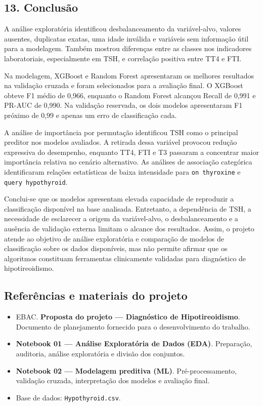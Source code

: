 \documentclass[
]{article}
\providecommand{\tightlist}{%
  \setlength{\itemsep}{0pt}\setlength{\parskip}{0pt}}
\begin{document}
\hypertarget{conclusuxe3o}{%
\subsection{13. Conclusão}\label{conclusuxe3o}}

A análise exploratória identificou desbalanceamento da variável-alvo,
valores ausentes, duplicatas exatas, uma idade inválida e variáveis sem
informação útil para a modelagem. Também mostrou diferenças entre as
classes nos indicadores laboratoriais, especialmente em TSH, e
correlação positiva entre TT4 e FTI.

Na modelagem, XGBoost e Random Forest apresentaram os melhores
resultados na validação cruzada e foram selecionados para a avaliação
final. O XGBoost obteve F1 médio de 0,966, enquanto o Random Forest
alcançou Recall de 0,991 e PR-AUC de 0,990. Na validação reservada, os
dois modelos apresentaram F1 próximo de 0,99 e apenas um erro de
classificação cada.

A análise de importância por permutação identificou TSH como o principal
preditor nos modelos avaliados. A retirada dessa variável provocou
redução expressiva do desempenho, enquanto TT4, FTI e T3 passaram a
concentrar maior importância relativa no cenário alternativo. As
análises de associação categórica identificaram relações estatísticas de
baixa intensidade para \texttt{on\ thyroxine} e
\texttt{query\ hypothyroid}.

Conclui-se que os modelos apresentam elevada capacidade de reproduzir a
classificação disponível na base analisada. Entretanto, a dependência de
TSH, a necessidade de esclarecer a origem da variável-alvo, o
desbalanceamento e a ausência de validação externa limitam o alcance dos
resultados. Assim, o projeto atende ao objetivo de análise exploratória
e comparação de modelos de classificação sobre os dados disponíveis, mas
não permite afirmar que os algoritmos constituam ferramentas
clinicamente validadas para diagnóstico de hipotireoidismo.

\hypertarget{referuxeancias-e-materiais-do-projeto}{%
\subsection{Referências e materiais do
projeto}\label{referuxeancias-e-materiais-do-projeto}}

\begin{itemize}
\tightlist
\item
  EBAC. \textbf{Proposta do projeto --- Diagnóstico de Hipotireoidismo}.
  Documento de planejamento fornecido para o desenvolvimento do
  trabalho.
\item
  \textbf{Notebook 01 --- Análise Exploratória de Dados (EDA)}.
  Preparação, auditoria, análise exploratória e divisão dos conjuntos.
\item
  \textbf{Notebook 02 --- Modelagem preditiva (ML)}. Pré-processamento,
  validação cruzada, interpretação dos modelos e avaliação final.
\item
  Base de dados: \texttt{Hypothyroid.csv}.
\end{itemize}
\end{document}
